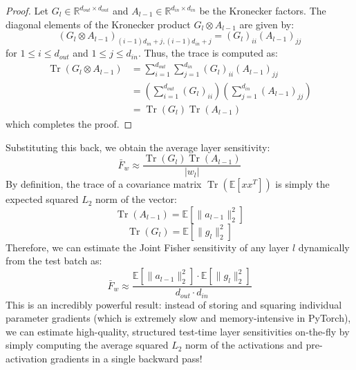 \documentclass{article}
\theoremstyle{plain}
\theoremstyle{definition}
\theoremstyle{remark}
\begin{document}
\begin{proof}
Let $G_l \in \mathbb{R}^{d_{out} \times d_{out}}$ and $A_{l-1} \in \mathbb{R}^{d_{in} \times d_{in}}$ be the Kronecker factors. The diagonal elements of the Kronecker product $G_l \otimes A_{l-1}$ are given by:
\begin{equation}
    (G_l \otimes A_{l-1})_{(i-1)d_{in} + j, (i-1)d_{in} + j} = (G_l)_{ii} (A_{l-1})_{jj}
\end{equation}
for $1 \leq i \leq d_{out}$ and $1 \leq j \leq d_{in}$. Thus, the trace is computed as:
\begin{align}
    \operatorname{Tr}(G_l \otimes A_{l-1}) &= \sum_{i=1}^{d_{out}} \sum_{j=1}^{d_{in}} (G_l)_{ii} (A_{l-1})_{jj} \\
    &= \left( \sum_{i=1}^{d_{out}} (G_l)_{ii} \right) \left( \sum_{j=1}^{d_{in}} (A_{l-1})_{jj} \right) \\
    &= \operatorname{Tr}(G_l) \operatorname{Tr}(A_{l-1})
\end{align}
which completes the proof.
\end{proof}

Substituting this back, we obtain the average layer sensitivity:
\begin{equation}
    \bar{F}_w \approx \frac{\operatorname{Tr}(G_l) \operatorname{Tr}(A_{l-1})}{|w_l|}
\end{equation}
By definition, the trace of a covariance matrix $\operatorname{Tr}(\mathbb{E}[x x^T])$ is simply the expected squared $L_2$ norm of the vector:
\begin{equation}
    \operatorname{Tr}(A_{l-1}) = \mathbb{E}[\|a_{l-1}\|_2^2]
\end{equation}
\begin{equation}
    \operatorname{Tr}(G_l) = \mathbb{E}[\|g_l\|_2^2]
\end{equation}
Therefore, we can estimate the Joint Fisher sensitivity of any layer $l$ dynamically from the test batch as:
\begin{equation}
    \bar{F}_w \approx \frac{\mathbb{E}[\|a_{l-1}\|_2^2] \cdot \mathbb{E}[\|g_l\|_2^2]}{d_{out} \cdot d_{in}}
\end{equation}
This is an incredibly powerful result: instead of storing and squaring individual parameter gradients (which is extremely slow and memory-intensive in PyTorch), we can estimate high-quality, structured test-time layer sensitivities on-the-fly by simply computing the average squared $L_2$ norm of the activations and pre-activation gradients in a single backward pass!
\end{document}
